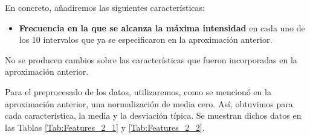 \documentclass[12pt]{article}
\begin{document}
En concreto, añadiremos las siguientes características:

\begin{itemize}
	\item \textbf{Frecuencia en la que se alcanza la máxima intensidad} en cada uno de los 10 intervalos
	que ya se especificaron en la aproximación anterior.
\end{itemize}

No se producen cambios sobre las características que fueron incorporadas en la aproximación anterior.

Para el preprocesado de los datos, utilizaremos, como se mencionó en la aproximación anterior,
una normalización de media cero.
Así, obtuvimos para cada característica, la media y la desviación típica. Se muestran dichos datos en las Tablas \ref{Tab:Features_2_1}
y \ref{Tab:Features_2_2}.

\bigskip
\end{document}
